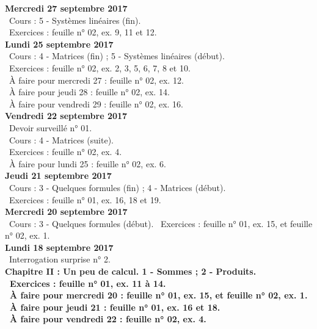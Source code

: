 \documentclass[12pt,a4paper]{article}
\begin{document}
\noindent\textbf{\bf Mercredi 27 septembre 2017}\\
\bu\ Cours : 5 - Systèmes linéaires (fin).\\
\bu\ Exercices : feuille n° 02, ex. 9, 11 et 12.\vspace{.4cm}\\

\noindent\textbf{\bf Lundi 25 septembre 2017}\\
\bu\ Cours : 4 - Matrices (fin) ; 5 - Systèmes linéaires (début).\\
\bu\ Exercices : feuille n° 02, ex. 2, 3, 5, 6, 7, 8 et 10.\\
\bu\ À faire pour mercredi 27 : feuille n° 02, ex. 12.\\
\bu\ À faire pour jeudi 28 : feuille n° 02, ex. 14.\\
\bu\ À faire pour vendredi 29 : feuille n° 02, ex. 16.\vspace{.4cm}\\

\noindent\textbf{Vendredi 22 septembre 2017}\\
\bu\ Devoir surveillé n° 01.\\
\bu\ Cours : 4 - Matrices (suite).\\
\bu\ Exercices : feuille n° 02, ex. 4.\\
\bu\ À faire pour lundi 25 : feuille n° 02, ex. 6.\vspace{.4cm}\\

\noindent\textbf{Jeudi 21 septembre 2017}\\
\bu\ Cours : 3 - Quelques formules (fin) ; 4 - Matrices (début).\\
\bu\ Exercices : feuille n° 01, ex. 16, 18 et 19.\vspace{.4cm}\\

\noindent\textbf{\bf Mercredi 20 septembre 2017}\\
\bu\ Cours : 3 - Quelques formules (début).
\bu\ Exercices : feuille n° 01, ex. 15, et feuille n° 02, ex. 1.\vspace{.4cm}\\

\noindent\textbf{\bf Lundi 18 septembre 2017}\\
\bu\ Interrogation surprise n° 2.\\
\bf Chapitre II \rm : Un peu de calcul. 1 - Sommes ; 2 - Produits.\\
\bu\ Exercices : feuille n° 01, ex. 11 à 14.\\
\bu\ À faire pour mercredi 20 : feuille n° 01, ex. 15, et feuille n° 02, ex. 1.\\
\bu\ À faire pour jeudi 21 : feuille n° 01, ex. 16 et 18.\\
\bu\ À faire pour vendredi 22 : feuille n° 02, ex. 4.\vspace{.4cm}\\
\end{document}
